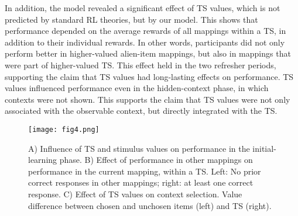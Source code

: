 \documentclass[10pt, letterpaper]{article}
\begin{document}
In addition, the model revealed a significant effect of TS values, which is not predicted by standard RL theories, but by our model. This shows that performance depended on the average rewards of all mappings within a TS, in addition to their individual rewards. In other words, participants did not only perform better in higher-valued alien-item mappings, but also in mappings that were part of higher-valued TS. This effect held in the two refresher periods, supporting the claim that TS values had long-lasting effects on performance. TS values influenced performance even in the hidden-context phase, in which contexts were not shown. This supports the claim that TS values were not only associated with the observable context, but directly integrated with the TS.

\begin{figure}[ht]
\begin{center}
\texttt{[image: fig4.png]}
\end{center}
\caption{
    A) Influence of TS and stimulus values on performance in the initial-learning phase.
    B) Effect of performance in other mappings on performance in the current mapping, within a TS. Left: No prior correct responses in other mappings; right: at least one correct response.
    C) Effect of TS values on context selection. Value difference between chosen and unchosen items (left) and TS (right).}
\label{figure:learning values}
\end{figure}
\end{document}
